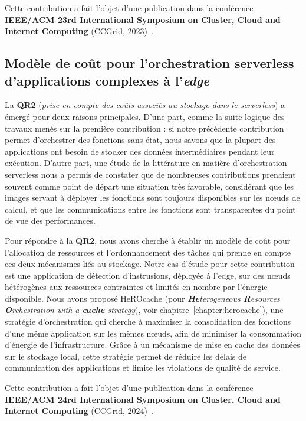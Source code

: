 Cette contribution a fait l'objet d'une publication dans la conférence \textbf{IEEE/ACM 23rd International Symposium on Cluster, Cloud and Internet Computing} (CCGrid, 2023)~\cite{herofake}.

\subsection{Modèle de coût pour l'orchestration serverless d'applications complexes à l'\textit{edge}}

La \textbf{QR2} (\textit{prise en compte des coûts associés au stockage dans le serverless}) a émergé pour deux raisons principales. D'une part, comme la suite logique des travaux menés sur la première contribution : si notre précédente contribution permet d'orchestrer des fonctions sans état, nous savons que la plupart des applications ont besoin de stocker des données intermédiaires pendant leur exécution. D'autre part, une étude de la littérature en matière d'orchestration serverless nous a permis de constater que de nombreuses contributions prenaient souvent comme point de départ une situation très favorable, considérant que les images servant à déployer les fonctions sont toujours disponibles sur les nœuds de calcul, et que les communications entre les fonctions sont transparentes du point de vue des performances.

Pour répondre à la \textbf{QR2}, nous avons cherché à établir un modèle de coût pour l'allocation de ressources et l'ordonnancement des tâches qui prenne en compte ces deux mécanismes liés au stockage. Notre cas d'étude pour cette contribution est une application de détection d'instrusions, déployée à l'edge, sur des nœuds hétérogènes aux ressources contraintes et limités en nombre par l'énergie disponible. Nous avons proposé HeROcache (pour \textit{\textbf{He}terogeneous \textbf{R}esources \textbf{O}rchestration with a \textbf{cache} strategy}), voir chapitre~\ref{chapter:herocache}), une stratégie d'orchestration qui cherche à maximiser la consolidation des fonctions d'une même application sur les mêmes nœuds, afin de minimiser la consommation d'énergie de l'infrastructure. Grâce à un mécanisme de mise en cache des données sur le stockage local, cette stratégie permet de réduire les délais de communication des applications et limite les violations de qualité de service.

Cette contribution a fait l'objet d'une publication dans la conférence \textbf{IEEE/ACM 24rd International Symposium on Cluster, Cloud and Internet Computing} (CCGrid, 2024)~\cite{herocache}.

